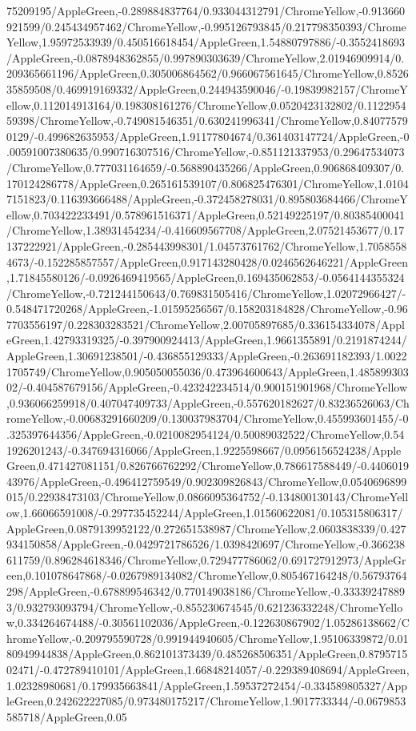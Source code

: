 {\begin{tikzternal}
75209195/AppleGreen,-0.289884837764/0.933044312791/ChromeYellow,-0.913660921599/0.245434957462/ChromeYellow,-0.995126793845/0.217798350393/ChromeYellow,1.95972533939/0.450516618454/AppleGreen,1.54880797886/-0.3552418693/AppleGreen,-0.0878948362855/0.997890303639/ChromeYellow,2.01946909914/0.209365661196/AppleGreen,0.305006864562/0.966067561645/ChromeYellow,0.852635859508/0.469919169332/AppleGreen,0.244943590046/-0.19839982157/ChromeYellow,0.112014913164/0.198308161276/ChromeYellow,0.0520423132802/0.112295459398/ChromeYellow,-0.749081546351/0.630241996341/ChromeYellow,0.840775790129/-0.499682635953/AppleGreen,1.91177804674/0.361403147724/AppleGreen,-0.00591007380635/0.990716307516/ChromeYellow,-0.851121337953/0.29647534073/ChromeYellow,0.777031164659/-0.568890435266/AppleGreen,0.906868409307/0.170124286778/AppleGreen,0.265161539107/0.806825476301/ChromeYellow,1.01047151823/0.116393666488/AppleGreen,-0.372458278031/0.895803684466/ChromeYellow,0.703422233491/0.578961516371/AppleGreen,0.52149225197/0.80385400041/ChromeYellow,1.38931454234/-0.416609567708/AppleGreen,2.07521453677/0.17137222921/AppleGreen,-0.285443998301/1.04573761762/ChromeYellow,1.70585584673/-0.152285857557/AppleGreen,0.917143280428/0.0246562646221/AppleGreen,1.71845580126/-0.0926469419565/AppleGreen,0.169435062853/-0.0564144355324/ChromeYellow,-0.721244150643/0.769831505416/ChromeYellow,1.02072966427/-0.548471720268/AppleGreen,-1.01595256567/0.158203184828/ChromeYellow,-0.967703556197/0.228303283521/ChromeYellow,2.00705897685/0.336154334078/AppleGreen,1.42793319325/-0.397900924413/AppleGreen,1.9661355891/0.2191874244/AppleGreen,1.30691238501/-0.436855129333/AppleGreen,-0.263691182393/1.00221705749/ChromeYellow,0.905050055036/0.473964600643/AppleGreen,1.48589930302/-0.404587679156/AppleGreen,-0.423242234514/0.900151901968/ChromeYellow,0.936066259918/0.407047409733/AppleGreen,-0.557620182627/0.83236526063/ChromeYellow,-0.00683291660209/0.130037983704/ChromeYellow,0.455993601455/-0.325397644356/AppleGreen,-0.0210082954124/0.50089032522/ChromeYellow,0.541926201243/-0.347694316066/AppleGreen,1.9225598667/0.0956156524238/AppleGreen,0.471427081151/0.826766762292/ChromeYellow,0.786617588449/-0.440601943976/AppleGreen,-0.496412759549/0.902309826843/ChromeYellow,0.0540696899015/0.22938473103/ChromeYellow,0.0866095364752/-0.134800130143/ChromeYellow,1.66066591008/-0.297735452244/AppleGreen,1.01560622081/0.105315806317/AppleGreen,0.0879139952122/0.272651538987/ChromeYellow,2.0603838339/0.427934150858/AppleGreen,-0.0429721786526/1.0398420697/ChromeYellow,-0.366238611759/0.896284618346/ChromeYellow,0.729477786062/0.691727912973/AppleGreen,0.101078647868/-0.0267989134082/ChromeYellow,0.805467164248/0.56793764298/AppleGreen,-0.678899546342/0.770149038186/ChromeYellow,-0.333392478893/0.932793093794/ChromeYellow,-0.855230674545/0.621236332248/ChromeYellow,0.334264674488/-0.30561102036/AppleGreen,-0.122630867902/1.05286138662/ChromeYellow,-0.209795590728/0.991944940605/ChromeYellow,1.95106339872/0.0180949944838/AppleGreen,0.862101373439/0.485268506351/AppleGreen,0.879571502471/-0.472789410101/AppleGreen,1.66848214057/-0.229389408694/AppleGreen,1.02328980681/0.179935663841/AppleGreen,1.59537272454/-0.334589805327/AppleGreen,0.242622227085/0.973480175217/ChromeYellow,1.9017733344/-0.0679853585718/AppleGreen,0.05
\end{tikzternal}}
